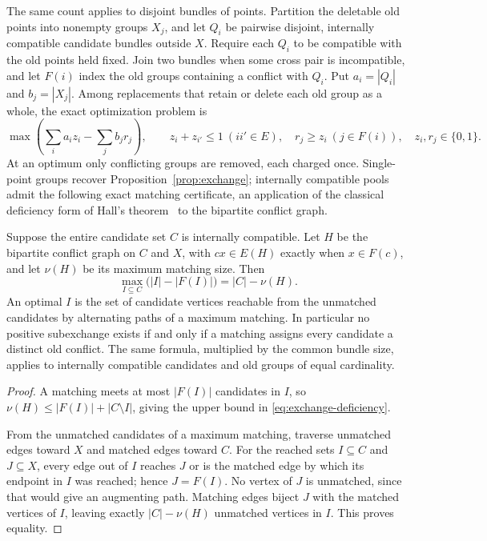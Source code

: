 The same count applies to disjoint bundles of points. Partition the
deletable old points into nonempty groups $X_j$, and let $Q_i$ be
pairwise disjoint, internally compatible candidate bundles outside $X$.
Require each $Q_i$ to be compatible with the old points held fixed.
Join two bundles when some cross pair is incompatible, and let $F(i)$
index the old groups containing a conflict with $Q_i$. Put
$a_i=|Q_i|$ and $b_j=|X_j|$. Among replacements that retain or delete
each old group as a whole, the exact optimization problem is
\begin{equation}\label{eq:bundle-exchange}
 \max\left(\sum_i a_i z_i-\sum_j b_j r_j\right),\qquad
 z_i+z_{i'}\le1\ (ii'\in E),\quad
 r_j\ge z_i\ (j\in F(i)),\quad z_i,r_j\in\{0,1\}.
\end{equation}
At an optimum only conflicting groups are removed, each charged once.
Single-point groups recover Proposition~\ref{prop:exchange}; internally
compatible pools admit the following exact matching certificate, an
application of the classical deficiency form of Hall's
theorem~\cite{hall1935} to the bipartite conflict graph.
\begin{proposition}
\label{prop:exchange-deficiency}
Suppose the entire candidate set $C$ is internally compatible. Let
$H$ be the bipartite conflict graph on $C$ and $X$, with
$cx\in E(H)$ exactly when $x\in F(c)$, and let $\nu(H)$ be its
maximum matching size. Then
\begin{equation}\label{eq:exchange-deficiency}
 \max_{I\subseteq C}\bigl(|I|-|F(I)|\bigr)=|C|-\nu(H).
\end{equation}
An optimal $I$ is the set of candidate vertices reachable from the
unmatched candidates by alternating paths of a maximum matching.
In particular no positive subexchange exists if and only if a matching
assigns every candidate a distinct old conflict.
The same formula, multiplied by the common bundle size, applies to
internally compatible candidates and old groups of equal cardinality.
\end{proposition}
\begin{proof}
A matching meets at most $|F(I)|$ candidates in $I$, so
$\nu(H)\le |F(I)|+|C\setminus I|$, giving the upper bound in
\eqref{eq:exchange-deficiency}.

From the unmatched candidates of a maximum matching, traverse unmatched
edges toward $X$ and matched edges toward $C$. For the reached sets
$I\subseteq C$ and $J\subseteq X$, every edge out of $I$ reaches $J$
or is the matched edge by which its endpoint in $I$ was reached;
hence $J=F(I)$. No vertex of $J$ is unmatched, since that would
give an augmenting path. Matching edges biject $J$ with the matched
vertices of $I$, leaving exactly $|C|-\nu(H)$ unmatched vertices in
$I$. This proves equality.
\end{proof}

